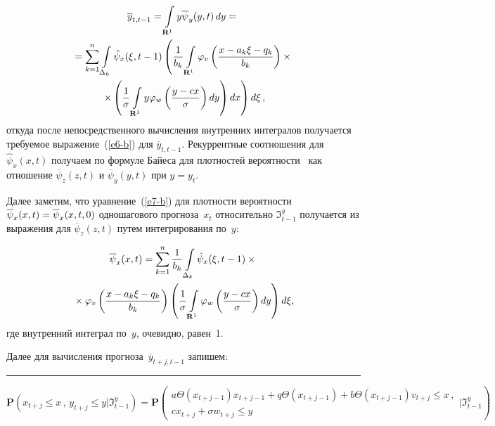 \begin{multicols}{2}
\noindent
  \begin{multline*}
  \overline{y}_{t,t-1}=\int\limits_{\mathbf{R}^1} y\overline{\psi}_y(y,t)\,dy= {}\\
  {}=
\sum\limits_{k=1}^n \int\limits_{\Delta_k} \hat{\psi}_x(\xi,t-1)\left( \displaystyle\frac{\displaystyle 1\mathstrut}{\displaystyle b_k\mathstrut} 
\int\limits_{\mathbf{R}^1}\varphi_v \left( \displaystyle\frac{\displaystyle x-a_k\xi-q_k\mathstrut}{\displaystyle b_k\mathstrut} \right)\times{}\right.\\
{}\left.\times
 \left( \displaystyle\frac{\displaystyle 1\mathstrut}{\displaystyle \sigma\mathstrut} 
\int\limits_{\mathbf{R}^1} y \varphi_w\left( \displaystyle\frac{\displaystyle y-cx\mathstrut}{\displaystyle \sigma\mathstrut} \right) dy \right) dx \right) d\xi\,,
  \end{multline*}
откуда после непосредственного вычисления внут\-рен\-них интегралов получается требуемое 
выражение~(\ref{e6-b}) для $\overline{y}_{t,t-1}$. 
Рекуррентные соотношения для $\hat{\psi}_x(x,t)$ получаем по формуле Байеса для 
плотностей вероятности~\cite{21-b} как отношение $\overline{\psi}_z(z,t)$ и 
$\overline{\psi}_y(y,t)$ при $y=y_t$.
  
  Далее заметим, что уравнение~(\ref{e7-b}) для плот\-ности вероятности 
$\overline{\psi}_x(x,t)\hm = \overline{\psi}_x(x,t,0)$ одношагового прогноза~$x_t$ 
относительно $\Im^y_{t-1}$ получается из выражения для $\overline{\psi}_z(z,t)$ путем 
интегрирования по~$y$:

\noindent
  \begin{multline*}
  \overline{\psi}_x(x,t) =\sum\limits_{k=1}^n \displaystyle\frac{\displaystyle 1\mathstrut}{\displaystyle b_k\mathstrut} \int\limits_{\Delta_k} 
\hat{\psi}_x(\xi,t-1)\times{}\\
{}\times \varphi_v\left ( \displaystyle\frac{\displaystyle x-a_k\xi-q_k\mathstrut}{\displaystyle b_k\mathstrut}\right) \left( \displaystyle\frac{\displaystyle 1\mathstrut}{\displaystyle \sigma\mathstrut} 
\int\limits_{\mathbf{R}^1} \varphi_w \left( \displaystyle\frac{\displaystyle y-cx\mathstrut}{\displaystyle \sigma\mathstrut}\right)dy\right)d\xi,
  \end{multline*}
где внутренний интеграл по~$y$, очевидно, равен~1.

  Далее для вычисления прогноза~$\overline{y}_{t+j,t-1}$ запишем:
  
  \end{multicols}
  
  \vspace*{3pt}
  
  \hrule
  
    \vspace*{6pt}
  
  \begin{equation*}
\mathbf{P}\left(x_{t+j}\leq x\,,\, y_{t+j}\leq y\vert \Im^y_{t-1}\right)
= \mathbf{P}\left( 
  \begin{array}{c}
  a\Theta(x_{t+j-1})x_{t+j-1}+q\Theta(x_{t+j-1})+b\Theta(x_{t+j-1})v_{t+j}\leq x\,,\\[9pt]
  cx_{t+j} +\sigma w_{t+j} \leq y
  \end{array}
  \Bigg\vert 
   \Im^y_{t-1}
  \right)
  \end{equation*}
  

